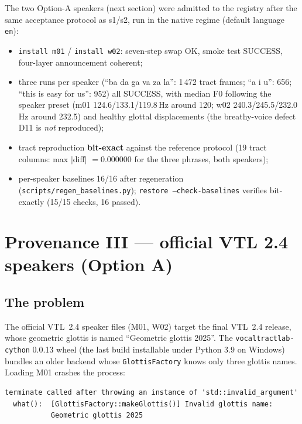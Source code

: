 \documentclass[11pt,a4paper]{article}
\newcommand{\code}[1]{\texttt{#1}}
\begin{document}
The two Option-A speakers (next section) were admitted to the
registry after the same acceptance protocol as s1/s2, run in the
native regime (default language \code{en}):

\begin{itemize}[leftmargin=1.5em]
\item \code{install m01} / \code{install w02}: seven-step swap OK,
      smoke test SUCCESS, four-layer announcement coherent;
\item three runs per speaker (``ba da ga va za la'': 1\,472 tract
      frames; ``a i u'': 656; ``this is easy for us'': 952) all
      SUCCESS, with median F0 following the speaker preset
      (m01 124.6/133.1/119.8\,Hz around 120; w02
      240.3/245.5/232.0\,Hz around 232.5) and healthy glottal
      displacements (the breathy-voice defect D11 is \emph{not}
      reproduced);
\item tract reproduction \textbf{bit-exact} against the reference
      protocol (19 tract columns: max $|$diff$|$ $= 0.000000$ for
      the three phrases, both speakers);
\item per-speaker baselines 16/16 after
      regeneration (\code{scripts/regen\_baselines.py});
      \code{restore --check-baselines} verifies bit-exactly
      (15/15 checks, 16 passed).
\end{itemize}

\section{Provenance III --- official VTL 2.4 speakers (Option A)}\label{sec:optiona}

\subsection{The problem}

The official VTL~2.4 speaker files (M01, W02) target the final
VTL~2.4 release, whose geometric glottis is named ``Geometric glottis
2025''. The \code{vocaltractlab-cython} 0.0.13 wheel (the last build
installable under Python 3.9 on Windows) bundles an older backend
whose \code{GlottisFactory} knows only three glottis names. Loading
M01 crashes the process:

\begin{lstlisting}[style=verbatim]
terminate called after throwing an instance of 'std::invalid_argument'
  what():  [GlottisFactory::makeGlottis()] Invalid glottis name:
           Geometric glottis 2025
\end{lstlisting}
\end{document}
